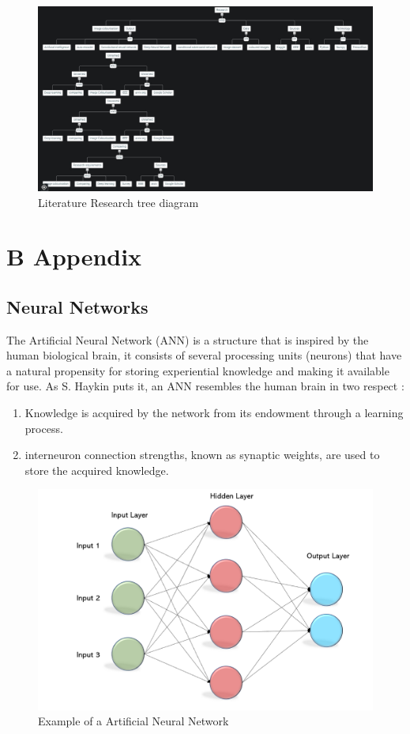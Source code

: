 \begin{figure}[H]
    \centering
    \includegraphics[width=1\columnwidth]{sections/appendix/my_research_tree.JPG}
    \caption{Literature Research tree diagram}
    \label{fig:my_label}
\end{figure}
\newpage
\chapter*{B Appendix}

\section*{Neural Networks} 
The Artificial Neural Network (ANN) is a structure that is inspired by the human biological brain, it consists of several processing units (neurons) that have a natural propensity for storing experiential knowledge and making it available for use. As S. Haykin puts it, an ANN resembles the human brain in two respect \cite{haykin2009neural}:
\begin{enumerate}
  \item Knowledge is acquired by the network from its endowment through a learning process. 
  \item interneuron connection strengths, known as synaptic weights, are used to store the acquired knowledge.
\end{enumerate}



\begin{figure}[H]
    \centering
    \includegraphics[width=0.5\columnwidth]{sections/figures/mlp.png}
    \caption{Example of a Artificial Neural Network \cite{mohanty_2019}}
    \label{fig:my_label}
\end{figure}

